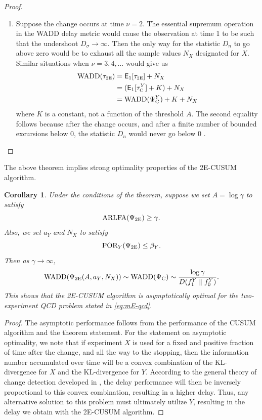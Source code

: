 \documentclass[journal, onecolumn]{IEEEtran}
\newtheorem{corollary}{Corollary}
\begin{document}
\begin{proof}
\begin{enumerate}
\item Suppose the change occurs at time $\nu = 2$. The essential supremum operation in the WADD delay metric would cause the observation at time 1 to be such that the undershoot $D_\sigma \to \infty$. Then the only way for the statistic $D_n$ to go above zero would be to exhaust all the sample values $N_X$ designated for $X$. Similar situations when $\nu = 3, 4, \dots$ would give us
\begin{align*}
\textup{WADD} (\tau_{\textup{\fontsize{6 pt}{10 pt}\selectfont 2E}})
& = \mathsf{E}_1 [\tau_{\textup{\fontsize{6 pt}{10 pt}\selectfont 2E}}] + N_X \\
& = (\mathsf{E}_1 [\tau_{\textup{\fontsize{6 pt}{10 pt}\selectfont C}}^Y] + K) + N_X \\
& = \textup{WADD} (\Psi_{\textup{C}}^Y) + K + N_X
\end{align*}
where $K$ is a constant, not a function of the threshold $A$. The second equality follows because after the change occurs, and after a finite number of bounded excursions below $0$, the statistic $D_n$ would never go below 0 \cite{banerjee2013}. 
\end{enumerate}
\end{proof}

The above theorem implies strong optimality properties of the 2E-CUSUM algorithm. 

\begin{corollary}
Under the conditions of the theorem, suppose we set $A = \log \gamma$ to satisfy 
$$ \textup{ARLFA} (\Psi_{\textup{2E}}) \geq \gamma. $$
Also, we set $a_Y$ and $N_X$ to satisfy
$$ \textup{POR}_Y (\Psi_{\textup{2E}}) \leq \beta_Y. $$
Then as $\gamma \to \infty$,
$$ \textup{WADD} (\Psi_{\textup{2E}} (A, a_Y, N_X)) \sim \textup{WADD} (\Psi_{\textup{C}}) \sim \frac{\log \gamma}{D(f_1^Y \mathrel{\Vert} f_0^Y)}. $$
This shows that the \textup{2E-CUSUM} algorithm is asymptotically optimal for the two-experiment QCD problem stated in \eqref{eq:mE-qcd}.
\end{corollary}

\begin{proof}
The asymptotic performance follows from the performance of the CUSUM algorithm and the theorem statement. For the statement on asymptotic optimality, we note that if experiment $X$ is used for a fixed and positive fraction of time after the change, and all the way to the stopping, then the information number accumulated over time will be a convex combination of the KL-divergence for $X$ and the KL-divergence for $Y$. According to the general theory of change detection developed in \cite{lai1998information}, the delay performance will then be inversely proportional to this convex combination, resulting in a higher delay. Thus, any alternative solution to this problem must ultimately utilize $Y$, resulting in the delay we obtain with the 2E-CUSUM algorithm. 
\end{proof}
\end{document}
